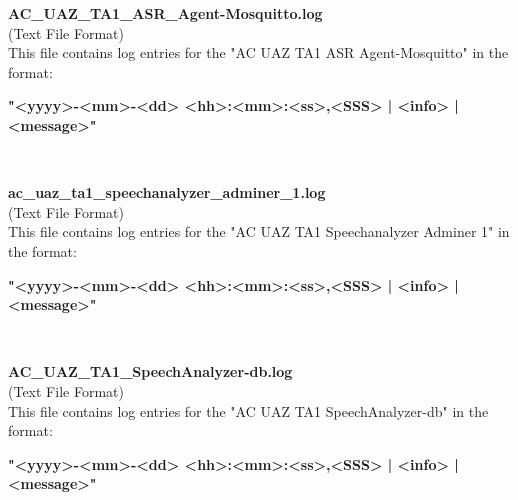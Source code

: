 \begin{description}
\begin{addmargin}[0em]{0em}
    \label{AC_UAZ_TA1_ASR_Agent-Mosquitto.log}
    \begin{addmargin}[1em]{0em} %
        \textbf{AC\_UAZ\_TA1\_ASR\_Agent-Mosquitto.log}\\
        (Text File Format)\\
        This file contains log entries for the "AC UAZ TA1 ASR Agent-Mosquitto" in the format:
        \begin{addmargin}[1em]{0em}
            \textbf{"<yyyy>-<mm>-<dd> <hh>:<mm>:<ss>,<SSS> | <info> | <message>"}
        \end{addmargin}
    \end{addmargin} %
    \textbf{\\}

    \label{ac_uaz_ta1_speechanalyzer_adminer_1.log}
    \begin{addmargin}[1em]{0em} %
        \textbf{ac\_uaz\_ta1\_speechanalyzer\_adminer\_1.log}\\
        (Text File Format)\\
        This file contains log entries for the "AC UAZ TA1 Speechanalyzer Adminer 1" in the format:
        \begin{addmargin}[1em]{0em}
            \textbf{"<yyyy>-<mm>-<dd> <hh>:<mm>:<ss>,<SSS> | <info> | <message>"}
        \end{addmargin}
    \end{addmargin} %
    \textbf{\\}

    \label{AC_UAZ_TA1_SpeechAnalyzer-db.log}
    \begin{addmargin}[1em]{0em} %
        \textbf{AC\_UAZ\_TA1\_SpeechAnalyzer-db.log}\\
        (Text File Format)\\
        This file contains log entries for the "AC UAZ TA1 SpeechAnalyzer-db" in the format:
        \begin{addmargin}[1em]{0em}
            \textbf{"<yyyy>-<mm>-<dd> <hh>:<mm>:<ss>,<SSS> | <info> | <message>"}
        \end{addmargin}
    \end{addmargin} %
    \textbf{\\}


\end{addmargin}
\end{description}
